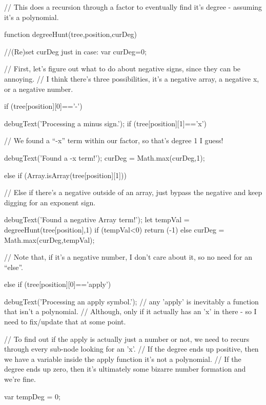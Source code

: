 \begin{javascript}
// This does a recursion through a factor to eventually find it's degree - assuming it's a polynomial.

function degreeHunt(tree,position,curDeg) {
    //(Re)set curDeg just in case:
    var curDeg=0;
    
    // First, let's figure out what to do about negative signs, since they can be annoying.
    //  I think there's three possibilities, it's a negative array, a negative x, or a negative number.
    
    if (tree[position][0]=='-') {
        debugText('Processing a minus sign.');
        if (tree[position][1]=='x') {
            // We found a ``-x'' term within our factor, so that's degree 1 I guess!
            
            debugText('Found a -x term!');
            curDeg = Math.max(curDeg,1);
            
        } else if (Array.isArray(tree[position][1])) {
            // Else if there's a negative outside of an array, just bypass the negative and keep digging for an exponent sign.
            
            debugText('Found a negative Array term!');
            let tempVal = degreeHunt(tree[position],1)
            if (tempVal<0) { return (-1)} else {
                curDeg = Math.max(curDeg,tempVal);
            }
            
            
        }// Note that, if it's a negative number, I don't care about it, so no need for an ``else''.
    } else if (tree[position][0]=='apply') {
        debugText('Processing an apply symbol.');
        // any 'apply' is inevitably a function that isn't a polynomial.
        //  Although, only if it actually has an 'x' in there - so I need to fix/update that at some point.
        
        // To find out if the apply is actually just a number or not, we need to recurs through every sub-node looking for an 'x'.
        //  If the degree ends up positive, then we have a variable inside the apply function it's not a polynomial.
        //  If the degree ends up zero, then it's ultimately some bizarre number formation and we're fine.
        
        var tempDeg = 0;
        
}}
\end{javascript}
